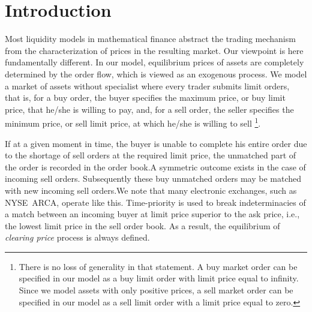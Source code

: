 \documentclass{article}
\begin{document}
\begin{abstract}
%
\end{abstract}

\section{Introduction}

Most liquidity models in mathematical finance abstract the trading mechanism
from the characterization of prices in the resulting market. Our viewpoint
is here fundamentally different. In our model, equilibrium prices of assets
are completely determined by the order flow, which is viewed as an exogenous
process. We model a market of assets without specialist where every trader
submits limit orders, that is, for a buy order, the buyer specifies the
maximum price, or buy limit price, that he/she is willing to pay, and, for a
sell order, the seller specifies the minimum price, or sell limit price, at
which he/she is willing to sell \footnote{%
There is no loss of generality in that statement. A buy market order can be
specified in our model as a buy limit order with limit price equal to
infinity. Since we model assets with only positive prices, a sell market
order can be specified in our model as a sell limit order with a limit price
equal to zero.}.

If at a given moment in time, the buyer is unable to complete his entire
order due to the shortage of sell orders at the required limit price, the
unmatched part of the order is recorded in the order book.A symmetric
outcome exists in the case of incoming sell orders. Subsequently these buy
unmatched orders may be matched with new incoming sell orders.We note that
many electronic exchanges, such as NYSE\ ARCA, operate like this.
Time-priority is used to break indeterminacies of a match between an
incoming buyer at limit price superior to the ask price, i.e., the lowest
limit price in the sell order book. As a result, the equilibrium of \textit{%
clearing price} process is always defined.
\end{document}

